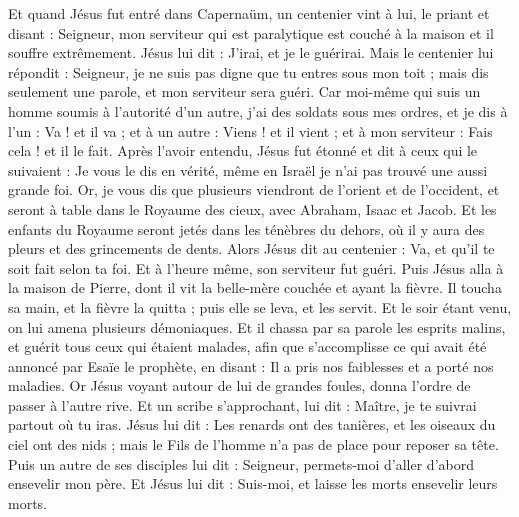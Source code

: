 \begin{multicols}{2}
Et quand Jésus fut entré dans Capernaüm, un centenier vint à lui, le priant
et disant : Seigneur, mon serviteur qui est paralytique est couché à la maison et il souffre extrêmement.
Jésus lui dit : J'irai, et je le guérirai.
Mais le centenier lui répondit : Seigneur, je ne suis pas digne que tu entres sous mon toit ; mais dis seulement une parole, et mon serviteur sera guéri.
Car moi-même qui suis un homme soumis à l’autorité d’un autre, j'ai des soldats sous mes ordres, et je dis à l'un : Va ! et il va ; et à un autre : Viens ! et il vient ; et à mon serviteur : Fais cela ! et il le fait.
Après l’avoir entendu, Jésus fut étonné et dit à ceux qui le suivaient : Je vous le dis en vérité, même en Israël je n'ai pas trouvé une aussi grande foi.
Or, je vous dis que plusieurs viendront de l’orient et de l’occident, et seront à table dans le Royaume des cieux, avec Abraham, Isaac et Jacob.
Et les enfants du Royaume seront jetés dans les ténèbres du dehors, où il y aura des pleurs et des grincements de dents.
Alors Jésus dit au centenier : Va, et qu'il te soit fait selon ta foi. Et à l'heure même, son serviteur fut guéri.
Puis Jésus alla à la maison de Pierre, dont il vit la belle-mère couchée et ayant la fièvre.
Il toucha sa main, et la fièvre la quitta ; puis elle se leva, et les servit.
Et le soir étant venu, on lui amena plusieurs démoniaques. Et il chassa par sa parole les esprits malins, et guérit tous ceux qui étaient malades,
afin que s’accomplisse ce qui avait été annoncé par Esaïe le prophète, en disant : Il a pris nos faiblesses et a porté nos maladies{}.
Or Jésus voyant autour de lui de grandes foules, donna l’ordre de passer à l'autre rive.
Et un scribe s'approchant, lui dit : Maître, je te suivrai partout où tu iras.
Jésus lui dit : Les renards ont des tanières, et les oiseaux du ciel ont des nids ; mais le Fils de l'homme n'a pas de place pour reposer sa tête.
Puis un autre de ses disciples lui dit : Seigneur, permets-moi d'aller d’abord ensevelir mon père.
Et Jésus lui dit : Suis-moi, et laisse les morts ensevelir leurs morts.

\end{multicols}
